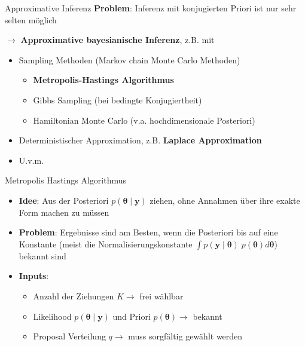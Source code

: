\documentclass[
  ignorenonframetext,
  aspectratio=169,
]{beamer}
\providecommand{\tightlist}{%
  \setlength{\itemsep}{0pt}\setlength{\parskip}{0pt}}
\newcommand{\by}{\bm{y}}
\newcommand{\btheta}{\bm{\theta}}
\begin{document}
\begin{frame}{Approximative Inferenz}
\protect{}\label{approximative-inferenz}
\textbf{Problem}: Inferenz mit konjugierten Priori ist nur sehr selten
möglich \autocite{polson_bayesian_2013}

\(\to\) \textbf{Approximative bayesianische Inferenz}, z.B. mit

\begin{itemize}
\tightlist
\item
  Sampling Methoden (Markov chain Monte Carlo Methoden)

  \begin{itemize}
  \tightlist
  \item
    \textbf{Metropolis-Hastings Algorithmus}
    \autocite{hastings_monte_1970}
  \item
    Gibbs Sampling (bei bedingte Konjugiertheit)
    \autocite{dellaportas_bayesian_1993}
  \item
    Hamiltonian Monte Carlo (v.a. hochdimensionale Posteriori)
    \autocite{neal_probabilistic_1993}
  \end{itemize}
\item
  Deterministischer Approximation, z.B. \textbf{Laplace Approximation}
  \autocite{tierney_accurate_1986}
\item
  U.v.m.
\end{itemize}
\end{frame}

\begin{frame}{Metropolis Hastings Algorithmus
\autocite{hastings_monte_1970}}
\protect{}\label{metropolis-hastings-algorithmus-hastings_monte_1970}
\begin{itemize}
\item
  \textbf{Idee}: Aus der Posteriori \(p(\btheta\mid \by)\) ziehen, ohne
  Annahmen über ihre exakte Form machen zu müssen
\item
  \textbf{Problem}: Ergebnisse sind am Besten, wenn die Posteriori bis
  auf eine Konstante (meist die Normalisierungskonstante
  \(\int p(\by \mid \btheta) \; p(\btheta) d \btheta\)) bekannt sind
\item
  \textbf{Inputs}:

  \begin{itemize}
  \tightlist
  \item
    Anzahl der Ziehungen \(K \to\) frei wählbar
  \item
    Likelihood \(p(\btheta \mid \by)\) und Priori \(p(\btheta) \to\)
    bekannt
  \item
    Proposal Verteilung \(q \to\) muss sorgfältig gewählt werden
  \end{itemize}
\end{itemize}
\end{frame}
\end{document}
